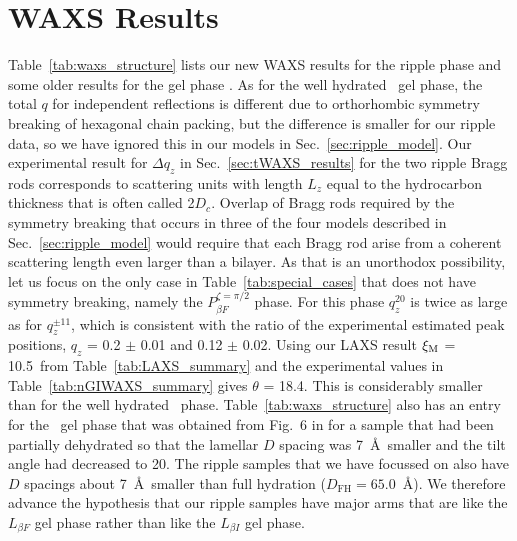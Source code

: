 \section{WAXS Results}\label{sec:waxs_results}
Table~\ref{tab:waxs_structure} lists our new WAXS results for the ripple phase 
and some older results for the gel phase \cite{Tristram-Nagle02}. As for the 
well hydrated \LbetaI\ gel phase, the total $q$ for independent 
reflections is different due to orthorhombic symmetry breaking of hexagonal 
chain packing, but the difference is smaller for our ripple data, so we have 
ignored this in our models in Sec.~\ref{sec:ripple_model}.  
Our experimental result for ${\Delta}q_z$ in Sec.~\ref{sec:tWAXS_results} for the two ripple Bragg 
rods corresponds to scattering units with length $L_z$ equal to the hydrocarbon 
thickness that is often called 2$D_c$. Overlap of Bragg rods required by the 
symmetry breaking that occurs in three of the four models described 
in Sec.~\ref{sec:ripple_model} would require that each Bragg rod arise from a coherent scattering 
length even larger than a bilayer. As that is an unorthodox possibility, let 
us focus on the only case in Table~\ref{tab:special_cases} that does not have 
symmetry breaking, namely the $P_{\beta F}^{\zeta=\pi/2}$ phase. For this 
phase $q_z^{20}$ is twice as large as for $q_z^{{\pm}11}$,
which is consistent with the ratio of the experimental estimated peak 
positions, $q_z$ = 0.2 $\pm$ 0.01 and 0.12 $\pm$ 0.02. 
Using our LAXS result $\xi_\text{M}$ = 10.5\textdegree\ from Table~\ref{tab:LAXS_summary} 
and the experimental values in Table~\ref{tab:nGIWAXS_summary} gives 
$\theta$ = 18.4\textdegree. This is considerably smaller than for the well 
hydrated \LbetaI\ phase. Table~\ref{tab:waxs_structure} also has an entry 
for the \LbetaF\ gel phase that was obtained from Fig.~6 in \cite{Tristram-Nagle02} for a 
sample that had been partially dehydrated so that the lamellar $D$ spacing was 
7~\AA\ smaller and the tilt angle had decreased to 20\textdegree. The ripple 
samples that we have focussed on also have $D$ spacings about 7~\AA\ smaller 
than full hydration ($D_\text{FH}=65.0$~\AA \cite{ref:Wack89}).  We therefore advance the 
hypothesis that our ripple samples have major arms that are like the 
$L_{\beta F}$ gel phase rather than like the $L_{\beta I}$ gel phase.

